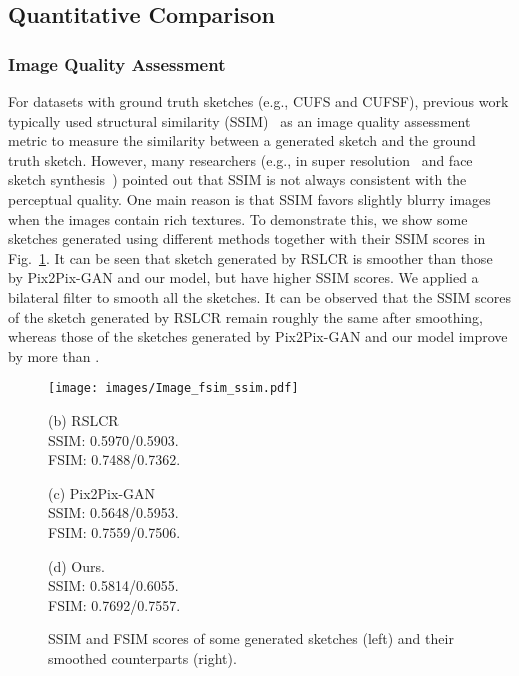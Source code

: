 \documentclass[runningheads]{llncs}
\begin{document}
\subsection{Quantitative Comparison}

\subsubsection{Image Quality Assessment}

For datasets with ground truth sketches (e.g., CUFS and CUFSF), previous work \cite{wangrslcr,Gao2017cagan,ijcai2017-500} typically used structural similarity (SSIM)~\cite{karacan2013structure} as an image quality assessment metric to measure the similarity between a generated sketch and the ground truth sketch. However, many researchers (e.g., in super resolution~\cite{ledig2016photo} and face sketch synthesis~\cite{WANG2017,Wang2017psman}) pointed out that SSIM is not always consistent with the perceptual quality. One main reason is that SSIM favors slightly blurry images when the images contain rich textures. To demonstrate this, we show some sketches generated using different methods together with their SSIM scores in Fig.~\ref{fig:blur-example}. It can be seen that sketch generated by RSLCR is smoother than those by Pix2Pix-GAN and our model, but have higher SSIM scores. We applied a bilateral filter to smooth all the sketches. It can be observed that the SSIM scores of the sketch generated by RSLCR remain roughly the same after smoothing, whereas those of the sketches generated by Pix2Pix-GAN and our model improve by more than .
\begin{figure}[htbp]
\texttt{[image: images/Image\_fsim\_ssim.pdf]}
\begin{minipage}{.32\linewidth}
\centering
(b) RSLCR \\ SSIM: 0.5970/0.5903. \\   FSIM: 0.7488/0.7362.
\end{minipage}
\begin{minipage}{.32\linewidth}
\centering
(c) Pix2Pix-GAN \\SSIM: 0.5648/0.5953. \\   FSIM: 0.7559/0.7506.
\end{minipage}
\begin{minipage}{.32\linewidth}
\centering
(d) Ours. \\ SSIM: 0.5814/0.6055. \\   FSIM: 0.7692/0.7557.
\end{minipage}

   \caption{SSIM and FSIM scores of some generated sketches (left) and their smoothed counterparts (right).}
   \label{fig:blur-example}
\end{figure}
\end{document}
